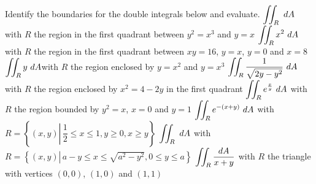 \begin{Exercise} Identify the boundaries for the  double integrals below and evaluate.
    \Question[difficulty = 2] $\displaystyle \iint_R\ dA$ \quad  with $R$ the region in the first quadrant between $y^2=x^3$ and $y=x$
    \Question[difficulty = 2] $\displaystyle \iint_R x^2 \ dA$ \quad with $R$ the region in the first quadrant between $xy=16$, $y=x$, $y=0$ and $x=8$
    \Question[difficulty = 2] $\displaystyle \iint_R y\ dA$\quad  with $R$ the region enclosed by $y=x^2$ and $y=x^3$
    \Question[difficulty = 2] $\ds \iint_R \dfrac{1}{\sqrt{2y-y^2}} \ dA$ \quad with $R$ the region enclosed by $x^2=4-2y$ in the first quadrant
    \Question[difficulty = 2] $\displaystyle \iint_R e^{\frac{x}{y}} \ dA$ \quad  with $R$ the region bounded by $y^2=x$, $x=0$ and $y=1$
    \Question[difficulty = 2] $\displaystyle \iint_R e^{-(x+y)} \ dA $ \quad with $R = \left\{ (x,y) \left|\, \dfrac{1}{2}\leq x \leq 1, y \geq 0, x \geq y \right. \right\}$ 
    \Question[difficulty = 3] $\displaystyle \iint_R  \ dA $ \quad with $R = \left\{ (x,y) \left|\, a-y \leq x \leq \sqrt{a^2-y^2}, 0 \leq y \leq a\right. \right\}$ 
    \Question[difficulty = 2] $\displaystyle \iint_R  \dfrac{dA}{x+y} $ \quad with $R$ the triangle with vertices $(0,0)$, $(1,0)$ and $(1,1)$  
\end{Exercise}

